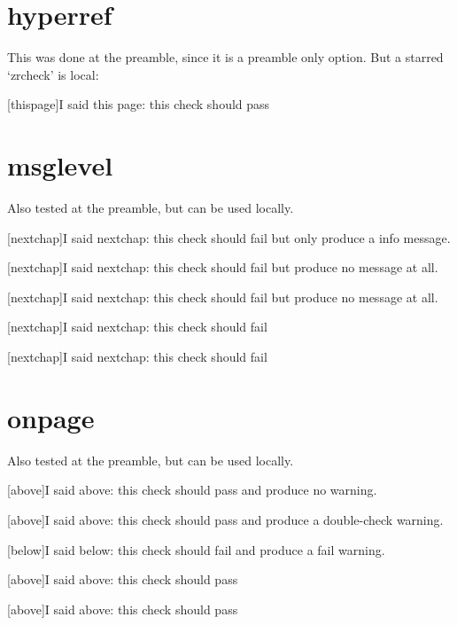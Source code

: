 \documentclass{book}
\begin{document}
\chapter{hyperref}

This was done at the preamble, since it is a preamble only option. But a
starred ‘zrcheck’ is local:

[thispage]{I said this page: this check should pass}

\chapter{msglevel}

Also tested at the preamble, but can be used locally.

[nextchap]{I said nextchap: this check should fail}
but only produce a info message.

[nextchap]{I said nextchap: this check should fail}
but produce no message at all.

[nextchap]{I said nextchap: this check should fail}
but produce no message at all.

[nextchap]{I said nextchap: this check should fail}

[nextchap]{I said nextchap: this check should fail}

\chapter{onpage}

Also tested at the preamble, but can be used locally.

[above]{I said above: this check should pass}
and produce no warning.

[above]{I said above: this check should pass}
and produce a double-check warning.

[below]{I said below: this check should fail}
and produce a fail warning.

[above]{I said above: this check should pass}

[above]{I said above: this check should pass}
\end{document}
